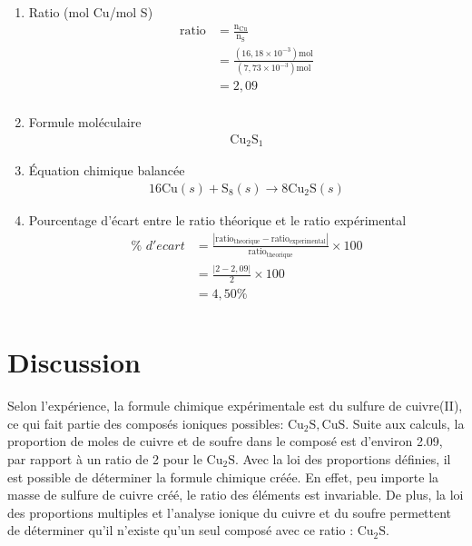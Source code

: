 \documentclass[11pt]{article}
\begin{document}
\begin{enumerate}
\item Ratio (mol Cu/mol S)
\begin{equation*}
\begin{split}
\mathrm{ratio}&=\frac{\mathrm{n_{Cu}}}{\mathrm{n_{S}}}\\
              &=\frac{(16,18\times10^{-3})\mathrm{mol}}{(7,73\times10^{-3})\mathrm{mol}}\\
              &=2,09\\
\end{split}
\end{equation*}

\item Formule moléculaire
\begin{equation*}
\begin{split}
\mathrm{Cu_{2}S_{1}}
\end{split}
\end{equation*}

\item Équation chimique balancée
\begin{equation*}
\begin{split}
16\mathrm{Cu}(s)+\mathrm{S_8}(s)\rightarrow8\mathrm{Cu_{2}S}(s)
\end{split}
\end{equation*}

\item Pourcentage d'écart entre le ratio théorique et le ratio expérimental
\begin{equation*}
\begin{split}
\%\,\, d'ecart&=\frac{|\mathrm{ratio_{theorique}-ratio_{experimental}}|}{\mathrm{ratio_{theorique}}}\times100\\
              &=\frac{|2-2,09|}{2}\times100\\
              &=4,50\%\\
\end{split}
\end{equation*}
\end{enumerate}

\section*{Discussion}
Selon l'expérience, la formule chimique expérimentale est du sulfure de cuivre(II), ce qui fait partie des composés ioniques possibles: $\mathrm{Cu_2S}, \mathrm{CuS}$. Suite aux calculs, la proportion de moles de cuivre et de soufre dans le composé est d'environ 2.09, par rapport à un ratio de 2 pour le $\mathrm{Cu_2S}$. Avec la loi des proportions définies, il est possible de déterminer la formule chimique créée. En effet, peu importe la masse de sulfure de cuivre créé, le ratio des éléments est invariable. De plus, la loi des proportions multiples et l'analyse ionique du cuivre et du soufre permettent de déterminer qu'il n'existe qu'un seul composé avec ce ratio : $\mathrm{Cu_2S}$.\\
\end{document}
